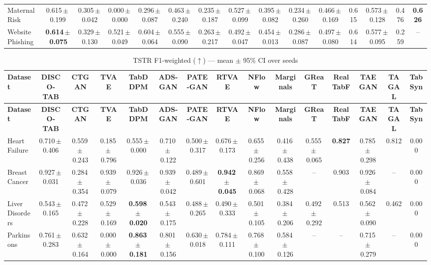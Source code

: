 \documentclass[8pt]{extarticle}
\begin{document}
\begin{longtable}{l*{14}{c}}
Maternal Risk & 0.615\,$\pm$\,0.199 & 0.305\,$\pm$\,0.042 & 0.000\,$\pm$\,0.000 & 0.296\,$\pm$\,0.087 & 0.463\,$\pm$\,0.240 & 0.235\,$\pm$\,0.187 & 0.527\,$\pm$\,0.099 & 0.395\,$\pm$\,0.082 & 0.234\,$\pm$\,0.260 & 0.466\,$\pm$\,0.169 & 0.615 & 0.573\,$\pm$\,0.128 & 0.476 & \textbf{0.626} \\
Website Phishing & \textbf{0.614\,$\pm$\,0.075} & 0.329\,$\pm$\,0.130 & 0.521\,$\pm$\,0.049 & 0.604\,$\pm$\,0.064 & 0.555\,$\pm$\,0.090 & 0.263\,$\pm$\,0.217 & 0.492\,$\pm$\,0.047 & 0.454\,$\pm$\,0.013 & 0.286\,$\pm$\,0.087 & 0.497\,$\pm$\,0.080 & 0.614 & 0.577\,$\pm$\,0.095 & 0.259 & -- \\
\end{longtable}
\begin{longtable}{l*{14}{c}}
\caption{TSTR F1-weighted ($\uparrow$) --- mean $\pm$ 95\% CI over seeds}\\
\toprule
\textbf{Dataset} & \textbf{DISCO-TAB} & \textbf{CTGAN} & \textbf{TVAE} & \textbf{TabDDPM} & \textbf{ADS-GAN} & \textbf{PATE-GAN} & \textbf{RTVAE} & \textbf{NFlow} & \textbf{Marginals} & \textbf{GReaT} & \textbf{RealTabF} & \textbf{TAEGAN} & \textbf{TAGAL} & \textbf{TabSyn} \\
\midrule
\endfirsthead
\toprule
\textbf{Dataset} & \textbf{DISCO-TAB} & \textbf{CTGAN} & \textbf{TVAE} & \textbf{TabDDPM} & \textbf{ADS-GAN} & \textbf{PATE-GAN} & \textbf{RTVAE} & \textbf{NFlow} & \textbf{Marginals} & \textbf{GReaT} & \textbf{RealTabF} & \textbf{TAEGAN} & \textbf{TAGAL} & \textbf{TabSyn} \\
\midrule
\endhead
\bottomrule
\endfoot
Heart Failure & 0.710\,$\pm$\,0.406 & 0.559\,$\pm$\,0.243 & 0.185\,$\pm$\,0.796 & 0.555\,$\pm$\,0.000 & 0.710\,$\pm$\,0.122 & 0.500\,$\pm$\,0.317 & 0.676\,$\pm$\,0.173 & 0.655\,$\pm$\,0.256 & 0.416\,$\pm$\,0.438 & 0.555\,$\pm$\,0.065 & \textbf{0.827} & 0.785\,$\pm$\,0.298 & 0.812 & 0.000 \\
Breast Cancer & 0.927\,$\pm$\,0.031 & 0.284\,$\pm$\,0.354 & 0.939\,$\pm$\,0.079 & 0.926\,$\pm$\,0.036 & 0.939\,$\pm$\,0.042 & 0.489\,$\pm$\,0.601 & \textbf{0.942\,$\pm$\,0.045} & 0.869\,$\pm$\,0.068 & 0.558\,$\pm$\,0.428 & -- & 0.903 & 0.926\,$\pm$\,0.084 & -- & 0.000 \\
Liver Disorders & 0.543\,$\pm$\,0.165 & 0.472\,$\pm$\,0.228 & 0.529\,$\pm$\,0.169 & \textbf{0.598\,$\pm$\,0.020} & 0.543\,$\pm$\,0.175 & 0.488\,$\pm$\,0.265 & 0.490\,$\pm$\,0.333 & 0.501\,$\pm$\,0.105 & 0.384\,$\pm$\,0.206 & 0.492\,$\pm$\,0.292 & 0.513 & 0.562\,$\pm$\,0.090 & 0.462 & 0.000 \\
Parkinsons & 0.761\,$\pm$\,0.283 & 0.632\,$\pm$\,0.164 & 0.000\,$\pm$\,0.000 & \textbf{0.863\,$\pm$\,0.181} & 0.801\,$\pm$\,0.156 & 0.630\,$\pm$\,0.018 & 0.784\,$\pm$\,0.111 & 0.768\,$\pm$\,0.100 & 0.584\,$\pm$\,0.126 & -- & -- & 0.715\,$\pm$\,0.279 & -- & 0.000 \\

\end{longtable}
\end{document}

